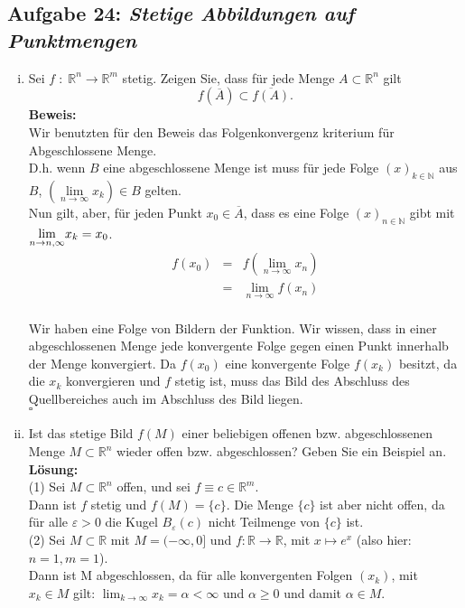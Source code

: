 \subsection*{Aufgabe 24: \mdseries\itshape Stetige Abbildungen auf Punktmengen}
\begin{enumerate}[(i)]
    \item Sei $f \; : \; \mathbb{R}^n \rightarrow \mathbb{R}^m$ stetig. Zeigen Sie, dass für jede
        Menge $ A \subset \mathbb{R}^n$ gilt
        $$
            f(\overline{A}) \subset \overline{f(A)}.
        $$
    \textbf{Beweis:}\\
        Wir benutzten für den Beweis das Folgenkonvergenz kriterium für Abgeschlossene Menge.\\
        D.h. wenn $B$ eine abgeschlossene Menge ist muss
        für jede Folge $(x)_{k\in \mathbb{N}}$ aus $B$,
        $\left( \underset{n \rightarrow \infty}{\lim} x_k \right) \in B$ gelten.\\

        Nun gilt, aber, für jeden Punkt $x_0 \in \overline{A}$, dass es eine Folge
        $(x)_{n \in \mathbb{N}}$ gibt mit $\underset{ n \rightarrow n,\infty}{\lim} x_k = x_0$.
        $$\begin{array}{rcl}
            f(x_0) &=& f(\underset{n \rightarrow \infty}{\lim} x_n)\\
                &=& \underset{n \rightarrow \infty}{\lim} f(x_n)\\
        \end{array}$$

        Wir haben eine Folge von Bildern der Funktion. Wir wissen, dass in einer abgeschlossenen
        Menge jede konvergente Folge gegen einen Punkt innerhalb der Menge konvergiert.
        Da $f(x_0)$ eine konvergente Folge $f(x_k)$ besitzt, da die $x_k$ konvergieren und $f$ stetig
        ist, muss das Bild des Abschluss des Quellbereiches  auch im Abschluss des Bild liegen.\\
        \mbox{} \hfill $\square$

    \item Ist das stetige Bild $f(M)$ einer beliebigen offenen bzw. abgeschlossenen Menge 
        $M \subset \mathbb{R}^n$ wieder offen bzw. abgeschlossen? Geben Sie ein Beispiel an.\\
    \textbf{Lösung:}\\
        (1) Sei $M \subset \mathbb{R}^n$ offen, und sei $f \equiv c \in \mathbb{R}^m$. \\
            Dann ist $f$ stetig und $f(M) = \{c\}$. Die Menge $\{c\}$ ist aber nicht offen, da für alle $\varepsilon > 0$ die Kugel $B_\varepsilon(c)$ nicht Teilmenge von $\{c\}$ ist.
\\
        (2) Sei $M \subset \mathbb{R}$ mit $M = (-\infty, 0]$ und $f: \mathbb{R} \to \mathbb{R}$, mit $x \mapsto e^x$ (also hier: $n = 1, m = 1$). \\
            Dann ist M abgeschlossen, da für alle konvergenten Folgen $(x_k)$, mit $x_k \in M$ gilt: $\lim_{k \to \infty} x_k = \alpha < \infty$ und $\alpha \geq 0$ und damit $\alpha \in M$.


\end{enumerate}
